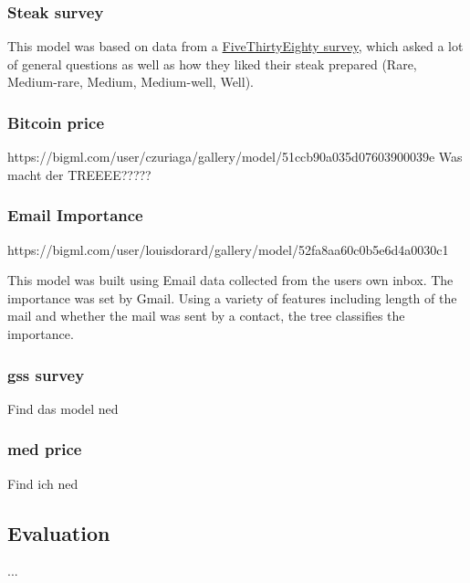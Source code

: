 \documentclass[a4paper,11pt]{article}
\begin{document}
        \subsubsection{Steak survey}
            
            This model was based on data from a \hyperlink{https://fivethirtyeight.com/features/how-americans-like-their-steak/}{FiveThirtyEighty survey}, which asked a lot of general questions as well as how they liked their steak prepared (Rare, Medium-rare, Medium, Medium-well, Well). 
            
        \subsubsection{Bitcoin price} 
            https://bigml.com/user/czuriaga/gallery/model/51ccb90a035d07603900039e
            Was macht der TREEEE?????
        
        \subsubsection{Email Importance}
            https://bigml.com/user/louisdorard/gallery/model/52fa8aa60c0b5e6d4a0030c1
        
            This model was built using Email data collected from the users own inbox. The importance was set by Gmail. Using a variety of features including length of the mail and whether the mail was sent by a contact, the tree classifies the importance.
            
        \subsubsection{gss survey}
            Find das model ned
            
        \subsubsection{med price}
            Find ich ned
            
    \subsection{Evaluation}
        ...
\end{document}
